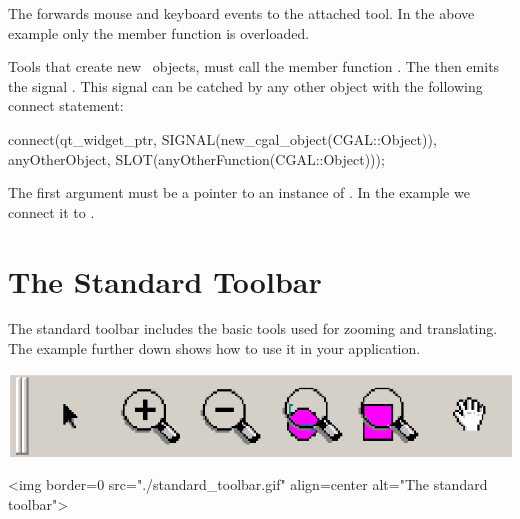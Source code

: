 The  forwards mouse and keyboard events to the attached tool.
In the above example only the  member function is overloaded.

Tools that create new \cgal\ objects, must call the member 
function . The  
then emits the signal . This signal can be 
catched by any other object with the following connect statement:


\begin{ccExampleCode}
connect(qt_widget_ptr, SIGNAL(new_cgal_object(CGAL::Object)), 
        anyOtherObject, SLOT(anyOtherFunction(CGAL::Object)));
\end{ccExampleCode}

The first argument must be a pointer to an instance of .
In the example we connect it to .

\section{The Standard Toolbar}
\label{Qt_widget_standard_toolbar}

The standard toolbar includes the basic tools used for zooming and
translating.  The example further down shows how to use it in your
application.

\begin{ccTexOnly}
\begin{center}
\includegraphics{standard_toolbar.eps} 
\end{center}
\end{ccTexOnly}
\begin{ccHtmlOnly}
<img border=0 src="./standard_toolbar.gif"  align=center  alt="The standard toolbar">
\end{ccHtmlOnly}

